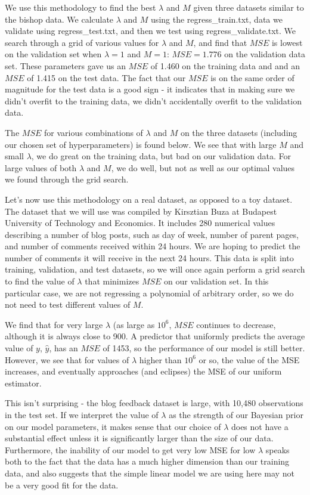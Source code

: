 \documentclass[10pt]{article}
\begin{document}
We use this methodology to find the best $\lambda$ and $M$ given three datasets similar to the bishop data. We calculate $\lambda$ and $M$ using the regress\_train.txt, data we validate using regress\_test.txt, and then we test using regress\_validate.txt. We search through a grid of various values for $\lambda$ and $M$, and find that $MSE$ is lowest on the validation set when $\lambda = 1$ and $M = 1$: $MSE = 1.776$ on the validation data set. These parameters gave us an $MSE$ of 1.460 on the training data and and an $MSE$ of 1.415 on the test data. The fact that our $MSE$ is on the same order of magnitude for the test data is a good sign - it indicates that in making sure we didn't overfit to the training data, we didn't accidentally overfit to the validation data.

The $MSE$ for various combinations of $\lambda$ and $M$ on the three datasets (including our chosen set of hyperparameters) is found below. We see that with large $M$ and small $\lambda$, we do great on the training data, but bad on our validation data. For large values of both $\lambda$ and $M$, we do well, but not as well as our optimal values we found through the grid search.

Let's now use this methodology on a real dataset, as opposed to a toy dataset. The dataset that we will use was compiled by Kirsztian Buza at Budapest University of Technology and Economics. It includes 280 numerical values describing a number of blog posts, such as day of week, number of parent pages, and number of comments received within 24 hours. We are hoping to predict the number of comments it will receive in the next 24 hours. This data is split into training, validation, and test datasets, so we will once again perform a grid search to find the value of $\lambda$ that minimizes $MSE$ on our validation set. In this particular case, we are not regressing a polynomial of arbitrary order, so we do not need to test different values of $M$.

We find that for very large $\lambda$ (as large as $10^6$, $MSE$ continues to decrease, although it is always close to 900. A predictor that uniformly predicts the average value of $y$, $\hat{y}$, has an $MSE$ of 1453, so the performance of our model is still better. However, we see that for values of $\lambda$ higher than $10^6$ or so, the value of the MSE increases, and eventually approaches (and eclipses) the MSE of our uniform estimator.

This isn't surprising - the blog feedback dataset is large, with 10,480 observations in the test set. If we interpret the value of $\lambda$ as the strength of our Bayesian prior on our model parameters, it makes sense that our choice of $\lambda$ does not have a substantial effect unless it is significantly larger than the size of our data. Furthermore, the inability of our model to get very low MSE for low $\lambda$ speaks both to the fact that the data has a much higher dimension than our training data, and also suggests that the simple linear model we are using here may not be a very good fit for the data.
\end{document}
